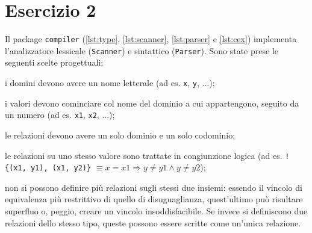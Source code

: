 \section{Esercizio 2}

Il package {\tt compiler} (\autoref{lst:type}, \ref{lst:scanner}, \ref{lst:parser} e \ref{lst:cex}) implementa l'analizzatore lessicale ({\tt Scanner}) e sintattico ({\tt Parser}). Sono state prese le seguenti scelte progettuali: %
%
\begin{enumerate*}

    \item i domini devono avere un nome letterale (ad es. {\tt x}, {\tt y}, ...);

    \item i valori devono cominciare col nome del dominio a cui appartengono,
    seguito da un numero (ad es. {\tt x1}, {\tt x2}, ...);

    \item le relazioni devono avere un solo dominio e un solo codominio;

    \item le relazioni su uno stesso valore sono trattate in congiunzione logica
    (ad es. {\tt !\{(x1, y1), (x1, y2)\}} $\equiv x = x1 \Rightarrow y \neq y1
    \land y \neq y2$);

    \item non si possono definire più relazioni sugli stessi due insiemi:
    essendo il vincolo di equivalenza più restrittivo di quello di
    disuguaglianza, quest'ultimo può risultare superfluo o, peggio, creare un
    vincolo insoddisfacibile. Se invece si definiscono due relazioni dello
    stesso tipo, queste possono essere scritte come un'unica relazione.

\end{enumerate*}





